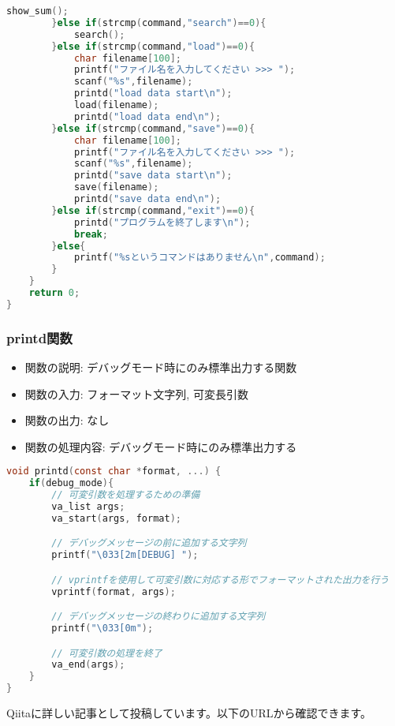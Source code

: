 \documentclass[a4paper,11pt]{jsarticle}
\begin{document}
\begin{lstlisting}[caption=main関数のコード, label=main, language=C]
            show_sum();
        }else if(strcmp(command,"search")==0){
            search();
        }else if(strcmp(command,"load")==0){
            char filename[100];
            printf("ファイル名を入力してください >>> ");
            scanf("%s",filename);
            printd("load data start\n");
            load(filename);
            printd("load data end\n");
        }else if(strcmp(command,"save")==0){
            char filename[100];
            printf("ファイル名を入力してください >>> ");
            scanf("%s",filename);
            printd("save data start\n");
            save(filename);
            printd("save data end\n");
        }else if(strcmp(command,"exit")==0){
            printd("プログラムを終了します\n");
            break;
        }else{
            printf("%sというコマンドはありません\n",command);
        }
    }
    return 0;
}
\end{lstlisting}

\newpage

\subsubsection*{printd関数}
\begin{itemize}
    \item 関数の説明: デバッグモード時にのみ標準出力する関数
    \item 関数の入力: フォーマット文字列, 可変長引数
    \item 関数の出力: なし
    \item 関数の処理内容: デバッグモード時にのみ標準出力する
\end{itemize}
\begin{lstlisting}[caption=printd関数のコード, label=printd, language=C]
void printd(const char *format, ...) {
    if(debug_mode){
        // 可変引数を処理するための準備
        va_list args;
        va_start(args, format);

        // デバッグメッセージの前に追加する文字列
        printf("\033[2m[DEBUG] ");

        // vprintfを使用して可変引数に対応する形でフォーマットされた出力を行う
        vprintf(format, args);

        // デバッグメッセージの終わりに追加する文字列
        printf("\033[0m");

        // 可変引数の処理を終了
        va_end(args);
    }
}
\end{lstlisting}

Qiitaに詳しい記事として投稿しています。以下のURLから確認できます。
\end{document}
